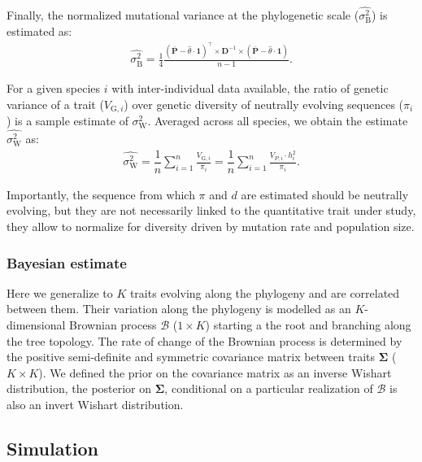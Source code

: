 \documentclass{article}
\newcommand{\Multiply}{\cdot}
\newcommand{\MultiplyMatrix}{\times}
\newcommand{\UniDimArray}[1]{\bm{#1}}
\newcommand{\BiDimArray}[1]{\bm{#1}}
\newcommand{\tr}{^{\intercal}}
\newcommand{\inv}{^{-1}}
\newcommand{\Spi}{i}
\newcommand{\NbrTaxa}{n}
\newcommand{\Trait}{P}
\newcommand{\Heredity}{h^2}
\newcommand{\VecTrait}{\UniDimArray{\bar{\Trait}}}
\newcommand{\RootTrait}{\widehat{\theta}}
\newcommand{\VecOne}{\UniDimArray{1}}
\newcommand{\Distance}{\BiDimArray{D}}
\newcommand{\DistanceMatrix}{\BiDimArray{\Distance}}
\newcommand{\VarGeneticSpi}{V_{\mathrm{G}, \Spi}}
\newcommand{\RatePhy}{\sigma^2_{\mathrm{B}}}
\newcommand{\RatePop}{\sigma^2_{\mathrm{W}}}
\newcommand{\EstRatePhy}{\widehat{\RatePhy}}
\newcommand{\EstRatePop}{\widehat{\RatePop}}
\newcommand{\Ntrait}{K}
\newcommand{\Covariancematrix}{\Sigma}
\newcommand{\CovarianceMatrix}{\BiDimArray{\Covariancematrix}}
\newcommand{\brownian}{\mathcal{B}}
\newcommand{\Brownian}{\UniDimArray{\brownian}}
\begin{document}
Finally, the normalized mutational variance at the phylogenetic scale ($\EstRatePhy$) is estimated\cite{omeara_testing_2006} as:
\begin{gather}
    \EstRatePhy = \frac{1}{4}\frac{\left( \VecTrait -  \RootTrait \Multiply \VecOne \right)\tr \MultiplyMatrix \DistanceMatrix\inv \MultiplyMatrix \left( \VecTrait -  \RootTrait \Multiply \VecOne  \right)}{\NbrTaxa - 1}. \label{eq:estimated-rate-phy}
\end{gather}

For a given species $\Spi$ with inter-individual data available, the ratio of genetic variance of a trait ($\VarGeneticSpi$) over genetic diversity of neutrally evolving sequences ($\pi_{\Spi}$) is a sample estimate of $\RatePop$.
Averaged across all species, we obtain the estimate $\EstRatePop$ as:
\begin{gather}
    \EstRatePop = \dfrac{1}{\NbrTaxa}\sum_{i=1}^{\NbrTaxa}\frac{  \VarGeneticSpi}{ \pi_{i}} = \dfrac{1}{\NbrTaxa}\sum_{i=1}^{\NbrTaxa} \frac{  V_{\Trait, i} \Multiply \Heredity_{i}}{ \pi_{i}}. \label{eq:estimated-rate-pop}
\end{gather}

Importantly, the sequence from which $\pi$ and $d$ are estimated should be neutrally evolving, but they are not necessarily linked to the quantitative trait under study, they allow to normalize for diversity driven by mutation rate and population size.

\subsubsection{Bayesian estimate}

Here we generalize to $\Ntrait$ traits evolving along the phylogeny and are correlated between them.
Their variation along the phylogeny is modelled as an $\Ntrait$-dimensional Brownian process $\Brownian$ ($1 \times \Ntrait$) starting a the root and branching along the tree topology.
The rate of change of the Brownian process is determined by the positive semi-definite and symmetric covariance matrix between traits $\CovarianceMatrix$ ($\Ntrait \times \Ntrait$).
We defined the {prior} on the covariance matrix as an inverse Wishart distribution, the {posterior} on $\CovarianceMatrix$, conditional on a particular realization of $\brownian$ is also an invert Wishart distribution.

\subsection{Simulation}\label{subsec:simulations}
\end{document}
